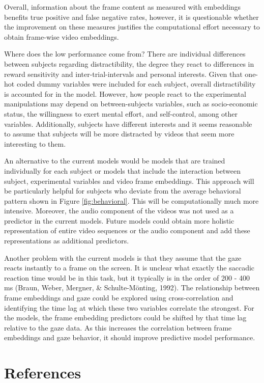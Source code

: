 \documentclass[
  man]{apa6}
\begin{document}
Overall, information about the frame content as measured with embeddings benefits true positive and false negative rates, however, it is questionable whether the improvement on these measures justifies the computational effort necessary to obtain frame-wise video embeddings.

Where does the low performance come from? There are individual differences between subjects regarding distractibility, the degree they react to differences in reward sensitivity and inter-trial-intervals and personal interests. Given that one-hot coded dummy variables were included for each subject, overall distractibility is accounted for in the model. However, how people react to the experimental manipulations may depend on between-subjects variables, such as socio-economic status, the willingness to exert mental effort, and self-control, among other variables. Additionally, subjects have different interests and it seems reasonable to assume that subjects will be more distracted by videos that seem more interesting to them.

An alternative to the current models would be models that are trained individually for each subject or models that include the interaction between subject, experimental variables and video frame embeddings. This approach will be particularly helpful for subjects who deviate from the average behavioral pattern shown in Figure \ref{fig:behavioral}. This will be computationally much more intensive. Moreover, the audio component of the videos was not used as a predictor in the current models. Future models could obtain more holistic representation of entire video sequences or the audio component and add these representations as additional predictors.

Another problem with the current models is that they assume that the gaze reacts instantly to a frame on the screen. It is unclear what exactly the saccadic reaction time would be in this task, but it typically is in the order of 200 - 400 ms (Braun, Weber, Mergner, \& Schulte-Mönting, 1992). The relationship between frame embeddings and gaze could be explored using cross-correlation and identifying the time lag at which these two variables correlate the strongest. For the models, the frame embedding predictors could be shifted by that time lag relative to the gaze data. As this increases the correlation between frame embeddings and gaze behavior, it should improve predictive model performance.

\newpage

\hypertarget{references}{%
\section{References}\label{references}}
\end{document}
